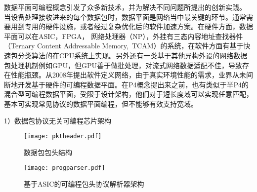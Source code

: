 
数据平面可编程概念引发了众多新技术，并为解决不同问题所提出的创新实践。
当设备处理接收进来的每个数据包时，数据平面是网络当中最关键的环节。通常需要用到专用的硬件设施，或者经过复杂优化后的软件加速方案。在硬件方面，数据平面可以在ASIC，FPGA， 网络处理器（NP），外挂有三态内容地址查找器件（Ternary Content Addressable Memory,~TCAM）的系统，在软件方面有基于快速包分类算法的在CPU系统上实现。另外还有一类基于其他异构外设的网络数据包处理机制例如GPU，但GPU善于做批处理，对流式网络数据适配不佳，导致存在性能瓶颈。从2008年提出软件定义网络，由于真实环境性能的需求，业界从未间断地开发基于硬件的可编程数据平面。在P4概念提出来之前，也有类似于半P4的混合型可编程数据平面，受限于设计架构，他们对于短长度域可以实现任意匹配，基本可实现常见协议的数据平面编程，但不能够有效支持宽域。

1）数据包协议无关可编程芯片架构



\begin{figure}[htbp]
	\centering 
	\vspace{-1.5mm}
	\begin{minipage}[t]{0.48\textwidth}
		\centering
		\texttt{[image: pktheader.pdf]}
		\caption{数据包包头结构} \label{fig:pktheader}
	\end{minipage}
	\begin{minipage}[t]{0.48\textwidth}
		\centering
		\texttt{[image: progparser.pdf]}
		\caption{基于ASIC的可编程包头协议解析器架构} \label{fig:progparser}
	\end{minipage}
\end{figure}



